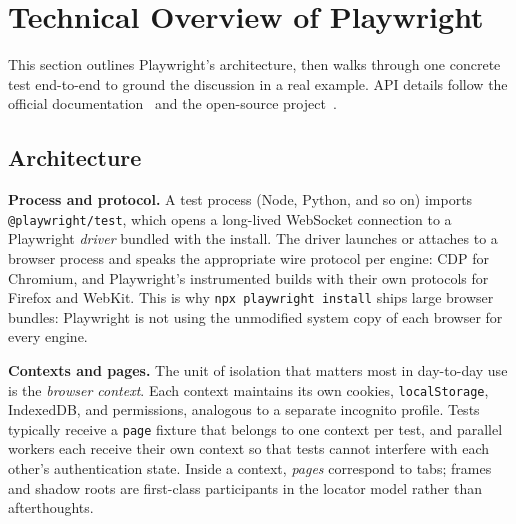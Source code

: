 \documentclass[12pt,letterpaper]{article}
\newcommand{\code}[1]{\texttt{#1}}
\begin{document}
\section{Technical Overview of Playwright}

This section outlines Playwright's architecture, then walks through one concrete test end-to-end to ground the discussion in a real example. API details follow the official documentation~\cite{pwdocs} and the open-source project~\cite{pwgh}.

\subsection{Architecture}

\textbf{Process and protocol.} A test process (Node, Python, and so on) imports \code{@playwright/test}, which opens a long-lived WebSocket connection to a Playwright \emph{driver} bundled with the install. The driver launches or attaches to a browser process and speaks the appropriate wire protocol per engine: CDP for Chromium, and Playwright's instrumented builds with their own protocols for Firefox and WebKit. This is why \code{npx playwright install} ships large browser bundles: Playwright is not using the unmodified system copy of each browser for every engine.

\textbf{Contexts and pages.} The unit of isolation that matters most in day-to-day use is the \emph{browser context}. Each context maintains its own cookies, \code{localStorage}, IndexedDB, and permissions, analogous to a separate incognito profile. Tests typically receive a \code{page} fixture that belongs to one context per test, and parallel workers each receive their own context so that tests cannot interfere with each other's authentication state. Inside a context, \emph{pages} correspond to tabs; frames and shadow roots are first-class participants in the locator model rather than afterthoughts.
\end{document}
